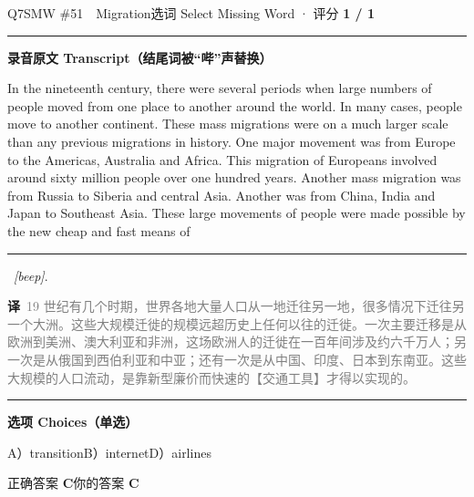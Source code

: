 \documentclass[11pt]{article}
\newcommand{\ptesub}[1]{%
  \par\needspace{2\baselineskip}\smallskip
  {\color{cAccent}\rule[-0.2ex]{3pt}{1.05em}}\hspace{6pt}%
  {\bfseries\color{cHead}#1}\par\nopagebreak\smallskip}
\newcommand{\zh}[1]{{\footnotesize\textcolor{cNote}{\textbf{译}}\ \textcolor{gray}{#1}}}
\begin{document}
\begin{qblock}{Q7\quad SMW \#51\ \ Migration}{选词 Select Missing Word · 评分 \textcolor{cAccent}{\bfseries 1 / 1}}
\ptesub{录音原文 Transcript（结尾词被“哔”声替换）}
\begin{promptbox}
In the nineteenth century, there were several periods when large numbers of people moved from one place to another around the world. In many cases, people move to another continent. These mass migrations were on a much larger scale than any previous migrations in history. One major movement was from Europe to the Americas, Australia and Africa. This migration of Europeans involved around sixty million people over one hundred years. Another mass migration was from Russia to Siberia and central Asia. Another was from China, India and Japan to Southeast Asia. These large movements of people were made possible by the new cheap and fast means of \rule{1.2cm}{0.4pt}\ \textit{[beep]}.
\end{promptbox}
\zh{19 世纪有几个时期，世界各地大量人口从一地迁往另一地，很多情况下迁往另一个大洲。这些大规模迁徙的规模远超历史上任何以往的迁徙。一次主要迁移是从欧洲到美洲、澳大利亚和非洲，这场欧洲人的迁徙在一百年间涉及约六千万人；另一次是从俄国到西伯利亚和中亚；还有一次是从中国、印度、日本到东南亚。这些大规模的人口流动，是靠新型廉价而快速的【交通工具】才得以实现的。}
\ptesub{选项 Choices（单选）}
{\small A）transition\quad B）internet\quad D）airlines}
\smallskip\par
{\small 正确答案 \textcolor{cFix}{\bfseries C}\qquad 你的答案 \textcolor{cFix}{\bfseries C}}
\end{qblock}
\end{document}
